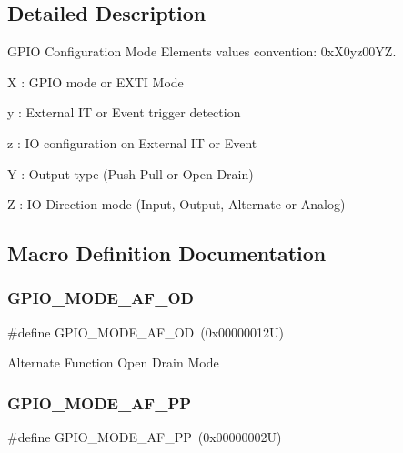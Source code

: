 \subsection{Detailed Description}
G\+P\+IO Configuration Mode Elements values convention\+: 0x\+X0yz00\+YZ. 


\begin{DoxyItemize}
\item X \+: G\+P\+IO mode or E\+X\+TI Mode
\item y \+: External IT or Event trigger detection
\item z \+: IO configuration on External IT or Event
\item Y \+: Output type (Push Pull or Open Drain)
\item Z \+: IO Direction mode (Input, Output, Alternate or Analog) 
\end{DoxyItemize}

\subsection{Macro Definition Documentation}
\mbox{\label{group___g_p_i_o__mode_ga282b9fd37c8ef31daba314ffae6bf023}} 
\subsubsection{\texorpdfstring{G\+P\+I\+O\+\_\+\+M\+O\+D\+E\+\_\+\+A\+F\+\_\+\+OD}{GPIO\_MODE\_AF\_OD}}
{\footnotesize\ttfamily \#define G\+P\+I\+O\+\_\+\+M\+O\+D\+E\+\_\+\+A\+F\+\_\+\+OD~(0x00000012\+U)}

Alternate Function Open Drain Mode \mbox{\label{group___g_p_i_o__mode_ga526c72c5264316fc05c775b6cad4aa6a}} 
\subsubsection{\texorpdfstring{G\+P\+I\+O\+\_\+\+M\+O\+D\+E\+\_\+\+A\+F\+\_\+\+PP}{GPIO\_MODE\_AF\_PP}}
{\footnotesize\ttfamily \#define G\+P\+I\+O\+\_\+\+M\+O\+D\+E\+\_\+\+A\+F\+\_\+\+PP~(0x00000002\+U)}


